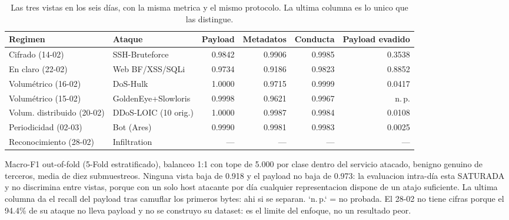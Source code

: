 \begin{table}[htbp]
  \centering
  \caption{Las tres vistas en los seis días, con la misma metrica y el mismo protocolo. La ultima columna es lo unico que las distingue.}
  \label{tab:regimenes}
  \small
  \begin{tabular}{llrrrr}
    \toprule
    \textbf{Regimen} & \textbf{Ataque} & \textbf{Payload} & \textbf{Metadatos} & \textbf{Conducta} & \textbf{Payload evadido} \\
    \midrule
    Cifrado (14-02) & SSH-Bruteforce & 0.9842 & 0.9906 & 0.9985 & 0.3538 \\
    En claro (22-02) & Web BF/XSS/SQLi & 0.9734 & 0.9186 & 0.9823 & 0.8852 \\
    Volumétrico (16-02) & DoS-Hulk & 1.0000 & 0.9715 & 0.9999 & 0.0417 \\
    Volumétrico (15-02) & GoldenEye+Slowloris & 0.9998 & 0.9621 & 0.9967 & n.\,p. \\
    Volum. distribuido (20-02) & DDoS-LOIC (10 orig.) & 1.0000 & 0.9987 & 0.9984 & 0.0108 \\
    Periodicidad (02-03) & Bot (Ares) & 0.9990 & 0.9981 & 0.9983 & 0.0025 \\
    Reconocimiento (28-02) & Infiltration & --- & --- & --- & --- \\
    \bottomrule
  \end{tabular}
  \par\smallskip\footnotesize{Macro-F1 out-of-fold (5-Fold estratificado), balanceo 1:1 con tope de 5.000 por clase dentro del servicio atacado, benigno genuino de terceros, media de diez submuestreos. Ninguna vista baja de 0.918 y el payload no baja de 0.973: la evaluacion intra-día esta SATURADA y no discrimina entre vistas, porque con un solo host atacante por día cualquier representacion dispone de un atajo suficiente. La ultima columna da el recall del payload tras camuflar los primeros bytes: ahi si se separan. `n.\,p.` = no probada. El 28-02 no tiene cifras porque el 94.4\% de su ataque no lleva payload y no se construyo su dataset: es el limite del enfoque, no un resultado peor.}
\end{table}
